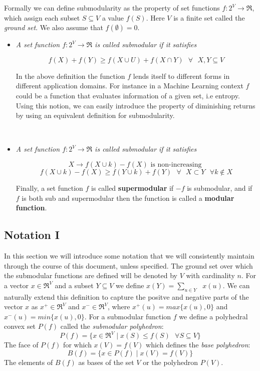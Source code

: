 Formally we can define submodularity as the property of set functions $f:2^V \rightarrow \Re$, which assign each subset $S \subseteq V$ a value $f(S)$. Here $V$ is a finite set called the {\it ground set}. We also assume that $f(\emptyset) = 0$.\\
\begin{itemize}
 \item {\bf {}} {\it A set function $f:2^V \rightarrow \Re$ is called submodular if it satisfies

\[
 f(X) + f(Y) \geq f(X \cup U) + f(X \cap Y) \text{  } \forall \text{  } X,Y \subseteq V
\]

In the above definition the function $f$ lends itself to different forms in different application domains. For instance in a Machine Learning context $f$ could be a function that evaluates information of a given set, i.e entropy. Using this notion, we can easily introduce the property of diminishing returns by using an equivalent definition for submodularity.}\\

\item {\bf {}} {\it A set function $f:2^V \rightarrow \Re$ is called submodular if it satisfies

\[
 X \rightarrow f(X\cup {k}) - f(X) \text{ is non-increasing }
 \]
 \[
 f(X \cup {k}) - f(X) \geq f(Y \cup {k}) + f(Y) \text{  } \forall \text{  } X\subset Y \text{  } \forall k \notin X
\]

Finally, a set function $f$ is called {\bf supermodular} if $-f$ is submodular, and if $f$ is both sub and supermodular then the function is called a {\bf modular function}.}
\end{itemize}

\subsection{Notation I}
\label{sec:notation}
In this section we will introduce some notation that we will consistently maintain through the course of this document, unless specified. The ground set over which the submodular functions are defined will be denoted by $V$ with cardinality $n$. For a vector $x \in \Re^V$ and a subset $Y \subseteq V$ we define $x(Y) = \underset{u \in Y}{\operatorname{\sum }}\text{ } x(u)$. We can naturally extend this definition to capture the positve and negative parts of the vector $x$ as $x^+\in \Re^V$ and $x^-\in \Re^V$, where $x^+(u) = max\{x(u),0\}$ and $x^-(u) = min\{x(u),0\}$. For a submodular function $f$ we define a polyhedral convex set $P(f)$ called the {\it submodular polyhedron}:
\[
 P(f) = \{ x\in \Re^V \mid x(S) \leq f(S) \text{ }\forall S\subseteq V \}
\]
The face of $P(f)$ for which $x(V) = f(V)$ which defines the {\it base polyhedron}:
\[
 B(f) = \{ x \in P(f) \mid x(V) = f(V)\}
\]
The elements of $B(f)$ as bases of the set $V$ or the polyhedron $P(V)$.


